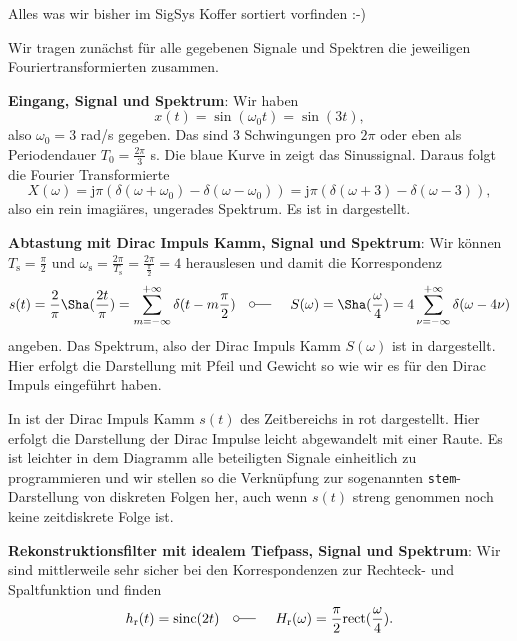 \begin{Werkzeug}
Alles was wir bisher im SigSys Koffer sortiert vorfinden :-)
\end{Werkzeug}
\begin{Ansatz}
Wir tragen zunächst für alle gegebenen Signale und Spektren die jeweiligen
Fouriertransformierten zusammen.

\textbf{Eingang, Signal und Spektrum}:
Wir haben
\begin{equation}
x(t) = \sin(\omega_0 t) = \sin(3 t),
\end{equation}
also  $\omega_0=3$ rad/s gegeben. Das sind 3 Schwingungen pro $2\pi$ oder eben
als Periodendauer $T_0 = \frac{2\pi}{3}$ s.
Die blaue Kurve in  zeigt das Sinussignal.
Daraus folgt die Fourier Transformierte
\begin{equation}
X(\omega) =
\mathrm{j} \pi \left( \delta(\omega+\omega_0) - \delta(\omega-\omega_0) \right) =
\mathrm{j} \pi \left( \delta(\omega+3) - \delta(\omega-3) \right),
\end{equation}
also ein rein imagiäres, ungerades Spektrum. Es ist in 
dargestellt.

\textbf{Abtastung mit Dirac Impuls Kamm, Signal und Spektrum}:
Wir können $T_\mathrm{s} = \frac{\pi}{2}$ und
$\omega_\mathrm{s} = \frac{2 \pi}{T_\mathrm{s}} = \frac{2 \pi}{\frac{\pi}{2}} = 4$
herauslesen und damit die Korrespondenz
\begin{equation}
s(t) = \frac{2}{\pi} {\Sha}(\frac{2 t}{\pi}) =
\sum_{m=-\infty}^{+\infty} \delta(t-m \frac{\pi}{2})
\quad\fourier\quad
S(\omega) = {\Sha}(\frac{\omega}{4}) =
4 \sum_{\nu=-\infty}^{+\infty} \delta(\omega-4 \nu)
\end{equation}
angeben. Das Spektrum, also der Dirac Impuls Kamm $S(\omega)$
ist in 
dargestellt. Hier erfolgt die Darstellung mit Pfeil und Gewicht so wie wir es
für den Dirac Impuls eingeführt haben.

In  ist der Dirac Impuls Kamm $s(t)$ des Zeitbereichs
in rot dargestellt. Hier erfolgt die Darstellung der Dirac Impulse leicht abgewandelt
mit einer Raute. Es ist leichter in dem Diagramm alle beteiligten Signale einheitlich
zu programmieren und wir stellen so die Verknüpfung zur sogenannten
\texttt{stem}-Darstellung von diskreten Folgen her, auch wenn $s(t)$ streng genommen
noch keine zeitdiskrete Folge ist.

\textbf{Rekonstruktionsfilter mit idealem Tiefpass, Signal und Spektrum}:
Wir sind mittlerweile sehr sicher bei den Korrespondenzen zur Rechteck- und
Spaltfunktion und finden
\begin{equation}
h_\mathrm{r}(t) = \mathrm{sinc}(2 t) \quad\fourier\quad
H_\mathrm{r}(\omega) = \frac{\pi}{2}\mathrm{rect}(\frac{\omega}{4}).
\end{equation}


\end{Ansatz}

